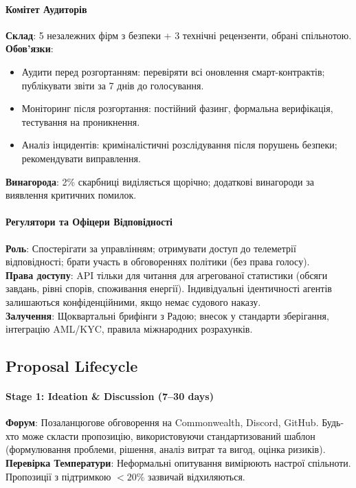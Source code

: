 \documentclass[11pt]{article}
\begin{document}
\paragraph{Комітет Аудиторів}
\textbf{Склад}: 5 незалежних фірм з безпеки + 3 технічні рецензенти, обрані спільнотою.\\
\textbf{Обов'язки}:
\begin{itemize}[noitemsep]
  \item Аудити перед розгортанням: перевіряти всі оновлення смарт-контрактів; публікувати звіти за 7 днів до голосування.
  \item Моніторинг після розгортання: постійний фазинг, формальна верифікація, тестування на проникнення.
  \item Аналіз інцидентів: криміналістичні розслідування після порушень безпеки; рекомендувати виправлення.
\end{itemize}
\textbf{Винагорода}: 2\% скарбниці виділяється щорічно; додаткові винагороди за виявлення критичних помилок.

\paragraph{Регулятори та Офіцери Відповідності}
\textbf{Роль}: Спостерігати за управлінням; отримувати доступ до телеметрії відповідності; брати участь в обговореннях політики (без права голосу).\\
\textbf{Права доступу}: API тільки для читання для агрегованої статистики (обсяги завдань, рівні спорів, споживання енергії). Індивідуальні ідентичності агентів залишаються конфіденційними, якщо немає судового наказу.\\
\textbf{Залучення}: Щоквартальні брифінги з Радою; внесок у стандарти зберігання, інтеграцію AML/KYC, правила міжнародних розрахунків.

\subsection{Proposal Lifecycle}

\paragraph{Stage 1: Ideation \& Discussion (7--30 days)}
\textbf{Форум}: Позаланцюгове обговорення на Commonwealth, Discord, GitHub. Будь-хто може скласти пропозицію, використовуючи стандартизований шаблон (формулювання проблеми, рішення, аналіз витрат та вигод, оцінка ризиків).\\
\textbf{Перевірка Температури}: Неформальні опитування вимірюють настрої спільноти. Пропозиції з підтримкою $<20\%$ зазвичай відхиляються.
\end{document}
